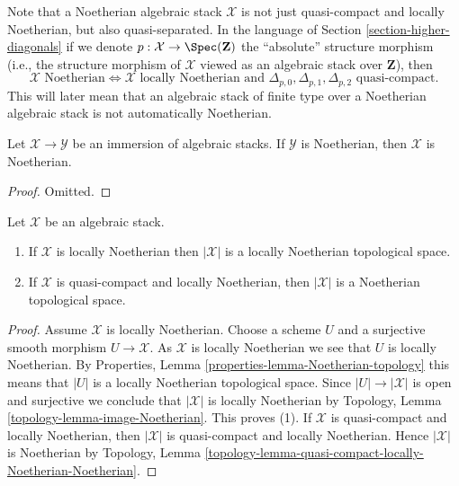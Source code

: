 \noindent
Note that a Noetherian algebraic stack $\mathcal{X}$ is not just quasi-compact
and locally Noetherian, but also quasi-separated. In the language of
Section \ref{section-higher-diagonals}
if we denote $p : \mathcal{X} \to \Spec(\mathbf{Z})$ the
``absolute'' structure morphism (i.e., the structure morphism of
$\mathcal{X}$ viewed as an algebraic stack over $\mathbf{Z}$), then
$$
\mathcal{X}\text{ Noetherian}
\Leftrightarrow
\mathcal{X}\text{ locally Noetherian and }
\Delta_{p, 0}, \Delta_{p, 1}, \Delta_{p, 2}
\text{ quasi-compact}.
$$
This will later mean that an algebraic stack of finite type over a
Noetherian algebraic stack is not automatically Noetherian.

\begin{lemma}
\label{lemma-locally-closed-in-noetherian}
Let $\mathcal{X} \to \mathcal{Y}$ be an immersion of algebraic stacks.
If $\mathcal{Y}$ is Noetherian, then $\mathcal{X}$ is Noetherian.
\end{lemma}

\begin{proof}
Omitted.
\end{proof}

\begin{lemma}
\label{lemma-Noetherian-topology}
Let $\mathcal{X}$ be an algebraic stack.
\begin{enumerate}
\item If $\mathcal{X}$ is locally Noetherian then $|\mathcal{X}|$
is a locally Noetherian topological space.
\item If $\mathcal{X}$ is quasi-compact and locally Noetherian, then
$|\mathcal{X}|$ is a Noetherian topological space.
\end{enumerate}
\end{lemma}

\begin{proof}
Assume $\mathcal{X}$ is locally Noetherian.
Choose a scheme $U$ and a surjective smooth morphism
$U \to \mathcal{X}$. As $\mathcal{X}$ is locally Noetherian
we see that $U$ is locally Noetherian. By
Properties, Lemma \ref{properties-lemma-Noetherian-topology}
this means that $|U|$ is a locally Noetherian topological space.
Since $|U| \to |\mathcal{X}|$ is open and surjective we conclude that
$|\mathcal{X}|$ is locally Noetherian by
Topology, Lemma \ref{topology-lemma-image-Noetherian}.
This proves (1). If $\mathcal{X}$ is quasi-compact and locally Noetherian,
then $|\mathcal{X}|$ is quasi-compact and locally Noetherian. Hence
$|\mathcal{X}|$ is Noetherian by Topology, Lemma
\ref{topology-lemma-quasi-compact-locally-Noetherian-Noetherian}.
\end{proof}






